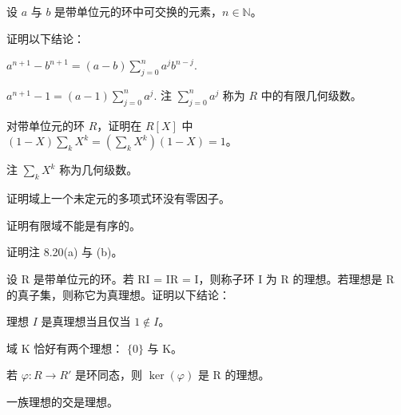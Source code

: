 \begin{exercises}
\item

设 $a$ 与 $b$ 是带单位元的环中可交换的元素，$n \in \mathbb{N}$。

证明以下结论：

\begin{items}
\item

$ a^{n+1} - b^{n+1} = (a - b) \sum_{j=0}^{n} a^j b^{n-j} $.

\item

$ a^{n+1} - 1 = (a - 1) \sum_{j=0}^{n} a^j $.
注  $ \sum_{j=0}^{n} a^{j} $ 称为 $ R $ 中的有限几何级数。

\end{items}

\item

对带单位元的环  $ R $，证明在  $ R[X] $ 中  $ (1 - X) \sum_k X^k = (\sum_k X^k)(1 - X) = 1 $。

注  $ \sum_k X^k $ 称为几何级数。

\item

证明域上一个未定元的多项式环没有零因子。

\item

证明有限域不能是有序的。

\item

证明注 8.20(a) 与 (b)。

\item

设 R 是带单位元的环。若 RI = IR = I，则称子环 I 为 R 的理想。若理想是 R 的真子集，则称它为真理想。证明以下结论：

\begin{items}
\item

理想 $I$ 是真理想当且仅当 $1 \notin I$。

\item

域 K 恰好有两个理想： $ \{0\} $ 与 K。

\item

若  $ \varphi: R \to R' $ 是环同态，则  $ \ker(\varphi) $ 是 R 的理想。

\item

一族理想的交是理想。


\end{items}
\end{exercises}
